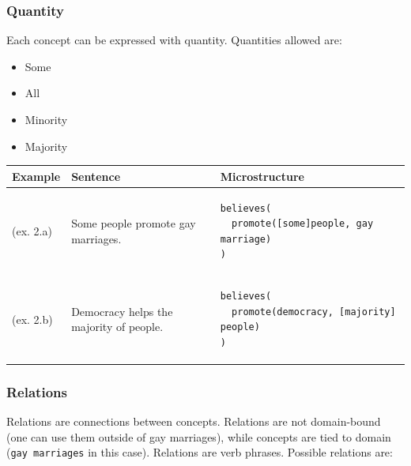 \subsubsection{Quantity}

Each concept can be expressed with quantity. Quantities allowed are:
\begin{itemize}
\item Some 
\item All
\item Minority
\item Majority
\end{itemize}

\begin{table}[!htb]
\begin{tabular}{@{}m{1.5cm} m{5cm} m{8cm}}
\toprule
Example & Sentence & Microstructure \\
\midrule
(ex. 2.a) & Some people promote gay marriages. & 
\begin{verbatim}
believes(
  promote([some]people, gay marriage)
) 
\end{verbatim}
\\
(ex. 2.b) &Democracy helps the majority of people. &
\begin{verbatim}
believes( 
  promote(democracy, [majority] people)
)
\end{verbatim} 
\\
\bottomrule
\end{tabular}
\end{table}

\subsubsection{Relations}

Relations are connections between concepts. Relations are not domain-bound (one
can use them outside of gay marriages), while concepts are tied to domain 
(\texttt{gay marriages} in this case). Relations are verb phrases. 
Possible relations are:

